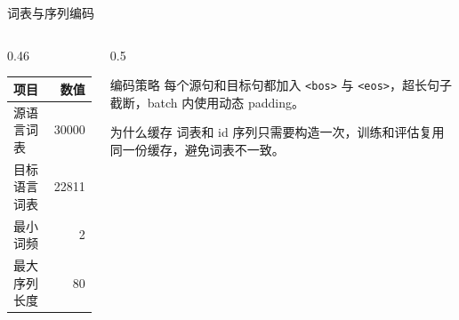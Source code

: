 \documentclass[aspectratio=169,10pt]{ctexbeamer}
\begin{document}
\begin{frame}{词表与序列编码}
	\begin{columns}[T,onlytextwidth]
		\begin{column}{0.46\textwidth}
			\begin{table}
				\centering
				\small
				\begin{tabular}{l r}
					\toprule
					项目 & 数值 \\
					\midrule
					源语言词表 & 30000 \\
					目标语言词表 & 22811 \\
					最小词频 & 2 \\
					最大序列长度 & 80 \\
					\bottomrule
				\end{tabular}
			\end{table}
		\end{column}
		\begin{column}{0.5\textwidth}
			\begin{block}{编码策略}
				每个源句和目标句都加入 \texttt{<bos>} 与 \texttt{<eos>}，超长句子截断，batch 内使用动态 padding。
			\end{block}
			\begin{block}{为什么缓存}
				词表和 id 序列只需要构造一次，训练和评估复用同一份缓存，避免词表不一致。
			\end{block}
		\end{column}
	\end{columns}
\end{frame}
\end{document}
